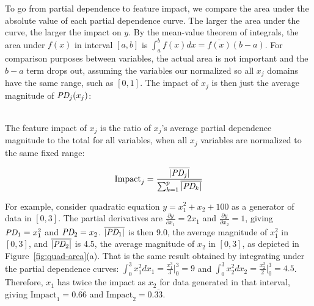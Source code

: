 \documentclass[11pt]{article}
\newcommand{\figref}[1]{Figure~\ref{#1}}
\newcommand{\todo}[1]{{{\small\color{red}{[#1]}}}}
\newcommand{\Imp}{\text{Impact}}
\begin{document}
To go from partial dependence to feature impact, we compare the area under the absolute value of each partial dependence curve. The larger the area under the curve, the larger the impact on $y$.   By the mean-value theorem of integrals, the area under $f(x)$ in interval $[a,b]$ is $\int_{a}^{b} f(x) dx = \overline{f(x)}(b-a)$.  For comparison purposes between variables, the actual area is not important and the $b-a$ term drops out, assuming the variables our normalized so all $x_j$ domains have the same range, such as $[0,1]$. The impact of $x_j$ is then just the average magnitude of $\text{\it PD}_j(x_j)$:

~\\
 The feature impact of $x_j$ is the ratio of $x_j$'s average partial dependence magnitude to the total for all variables, when all $x_j$ variables are normalized to the same fixed range:

\begin{equation}\label{eq:Epd2a}
\Imp_j = \frac{\overline{|\text{\it PD}_j|}}{\sum_{k=1}^p \overline{|\text{\it PD}_k|}}
\end{equation}

\todo{even if we had perfect PD, I'm not sure the following is true unless we get rid of the absolute value operators: $\overline{|y|} = \sum_{k=1}^p \overline{|\text{\it PD}_k|}$, meaning we cannot simplify the denominator for impact}


\noindent For example, consider quadratic equation $y = x_1^2 + x_2 + 100$ as a generator of data in $[0,3]$. The partial derivatives are $\frac{\partial y}{\partial x_1} = 2 x_1$ and $\frac{\partial y}{\partial x_2} = 1$, giving $\text{\it PD}_1 = x_1^2$ and $\text{\it PD}_2 = x_2$. $\overline{|\text{\it PD}_1|}$ is then 9.0, the average magnitude of $x_1^2$ in $[0,3]$, and $\overline{|\text{\it PD}_2|}$ is 4.5, the average magnitude of $x_2$ in $[0,3]$, as depicted in \figref{fig:quad-area}(a). That is the same result obtained by integrating under the partial dependence curves:  $\int_0^3 x_1^2 dx_1 = \frac{x_1^3}{3} \big |_0^3 = 9$ and $\int_0^3 x_2^2 dx_2 = \frac{x_2^2}{2} \big |_0^3 = 4.5$.   Therefore, $x_1$ has twice the impact as $x_2$ for data generated in that interval, giving $\Imp_1 = 0.\overline{66}$ and $\Imp_2 = 0.\overline{33}$.
\end{document}
